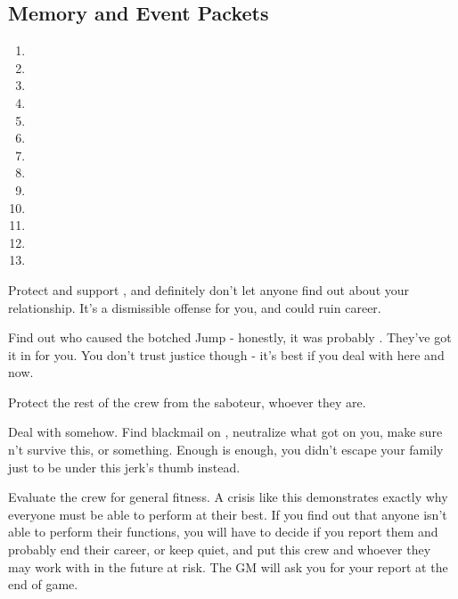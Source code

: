 \documentclass[char]{TMFHope}
\begin{document}
\subsection*{Memory and Event Packets}
\begin{enumerate}
	\item \mPractice{\MYname}
	\item \mXAlpha{\MYname}
	\item \mThreatOne{\MYname}
	\item \mThreatTwo{\MYname}
	\item \mThreatThree{\MYname}
	\item \mThreatFour{\MYname}
	\item \mBroom{\MYname}
	\item \mLab{\MYname}
	\item \mPatient{\MYname}
	\item \mKitchen{\MYname}
	\item \mWeight{\MYname}
	\item \mTheater{\MYname}
	\item \mCrates{\MYname}
\end{enumerate}

\begin{itemz}[Goals]
	\item Protect and support \cSci{}, and definitely don't let anyone find out about your relationship. It's a dismissible offense for you, and could ruin \cSci{\their} career.
	\item Find out who caused the botched Jump - honestly, it was probably \cDip{}. They've got it in for you. You don't trust \pPlan{} justice though - it's best if you deal with \cDip{\them} here and now.
	\item Protect the rest of the crew from the saboteur, whoever they are.
	\item Deal with \cDip{} somehow. Find blackmail on \cDip{\them}, neutralize what \cDip{\they} \cDip{\have} got on you, make sure \cDip{\they} \cDip{\does}n't survive this, or something. Enough is enough, you didn't escape your family just to be under this jerk's thumb instead.
	\item Evaluate the crew for general fitness. A crisis like this demonstrates exactly why everyone must be able to perform at their best. If you find out that anyone isn't able to perform their functions, you will have to decide if you report them and probably end their career, or keep quiet, and put this crew and whoever they may work with in the future at risk. The GM will ask you for your report at the end of game.
\end{itemz}
\end{document}
